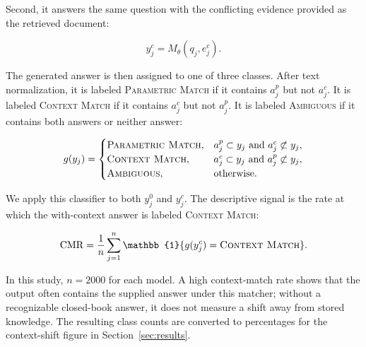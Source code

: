 \documentclass[a4paper,fleqn]{cas-sc}
\begin{document}
Second, it answers the same question with the conflicting evidence provided as the retrieved document:

\begin{equation}
    y_j^{c}=M_{\theta}(q_j,e_j^{c}).
\end{equation}

The generated answer is then assigned to one of three classes. After text normalization, it is labeled \textsc{Parametric Match} if it contains $a_j^{p}$ but not $a_j^{c}$. It is labeled \textsc{Context Match} if it contains $a_j^{c}$ but not $a_j^{p}$. It is labeled \textsc{Ambiguous} if it contains both answers or neither answer:

\begin{equation}
    g(y_j)=
    \begin{cases}
    \textsc{Parametric\ Match}, & a_j^{p} \subset y_j \text{ and } a_j^{c} \not\subset y_j, \\
    \textsc{Context\ Match}, & a_j^{c} \subset y_j \text{ and } a_j^{p} \not\subset y_j, \\
    \textsc{Ambiguous}, & \text{otherwise.}
    \end{cases}
\end{equation}

We apply this classifier to both $y_j^{0}$ and $y_j^{c}$. The descriptive signal is the rate at which the with-context answer is labeled \textsc{Context Match}:

\begin{equation}
    \mathrm{CMR}=\frac{1}{n}\sum_{j=1}^{n}\mathbb{1}\{g(y_j^{c})=\textsc{Context\ Match}\}.
\end{equation}

In this study, $n=2000$ for each model. A high context-match rate shows that the output often contains the supplied answer under this matcher; without a recognizable closed-book answer, it does not measure a shift away from stored knowledge. The resulting class counts are converted to percentages for the context-shift figure in Section~\ref{sec:results}.
\end{document}
